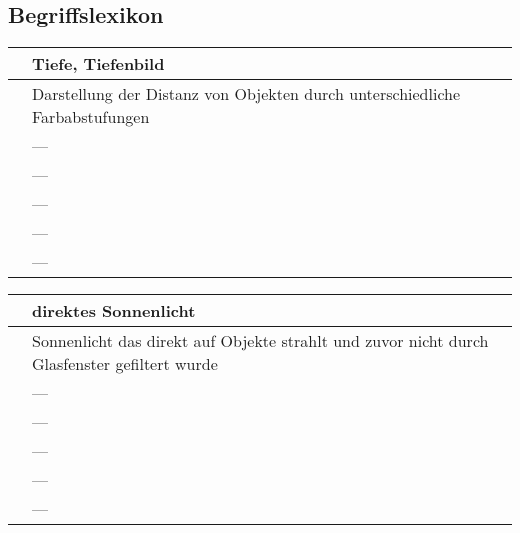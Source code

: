 \subsection{Begriffslexikon}
\begin{center}
	\hypertarget{tab:tiefe}{}
	\begin{tabular}{| p{4cm} | p{11cm} |}
		\hline
		\term & Tiefe, Tiefenbild \\ \hline
		
		\intent & Darstellung der Distanz von Objekten durch unterschiedliche Farbabstufungen \\ \hline
		
		\bound & --- \\ \hline
		
		\validity & --- \\ \hline
		
		\identifier & --- \\ \hline
		
		\blur & --- \\ \hline
		
		\crossref & --- \\
		\hline
	\end{tabular}
\end{center}

\begin{center}
	\hypertarget{tab:sonne}{}
	\begin{tabular}{| p{4cm} | p{11cm} |}
		\hline
		\term & direktes Sonnenlicht  \\ \hline
		
		\intent & Sonnenlicht das direkt auf Objekte strahlt und zuvor nicht durch Glasfenster gefiltert wurde \\ \hline
		
		\bound & --- \\ \hline
		
		\validity & --- \\ \hline
		
		\identifier & --- \\ \hline
		
		\blur & --- \\ \hline
		
		\crossref & --- \\
		\hline
	\end{tabular}
\end{center}

